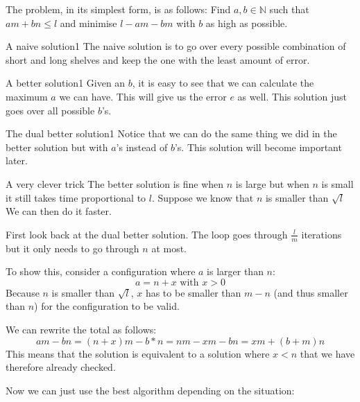 \documentclass{writeup}
\begin{document}
\begin{solutions}
  The problem, in its simplest form, is as follows:
  Find $a, b \in \mathbb{N}$ such that $am + bn \le l$ and minimise $l-am-bm$ with $b$ as high as possible.

  \begin{solution}{A naive solution}{}{1}
    The naive solution is to go over every possible combination of short and long shelves and keep the one with the least amount of error.
  \end{solution}

  \begin{solution}{A better solution}{}{1}
    Given an $b$, it is easy to see that we can calculate the maximum $a$ we can have.
    This will give us the error $e$ as well.
    This solution just goes over all possible $b$'s.
  \end{solution}

  \begin{solution}{The dual better solution}{}{1}
    Notice that we can do the same thing we did in the better solution but with $a$'s instead of $b$'s.
    This solution will become important later.
  \end{solution}

  \begin{solution}{A very clever trick}{}{}
    The better solution is fine when $n$ is large but when $n$ is small it still takes time proportional to $l$.
    Suppose we know that $n$ is smaller than $\sqrt{l}$
    We can then do it faster.

    First look back at the dual better solution.
    The loop goes through $\frac{l}{m}$ iterations but it only needs to go through $n$ at most.

    To show this, consider a configuration where $a$ is larger than $n$:
    \[ a = n + x \text{ with } x > 0 \]
    Because $n$ is smaller than $\sqrt{l}$, $x$ has to be smaller than $m-n$ (and thus smaller than $n$) for the configuration to be valid.

    We can rewrite the total as follows:
    \[
      a m - b n
      = (n + x) m - b * n
      = nm - xm - bn
      = x m + (b + m) n
    \]
    This means that the solution is equivalent to a solution where $x < n$ that we have therefore already checked.

    Now we can just use the best algorithm depending on the situation:

  \end{solution}
\end{solutions}
\end{document}
